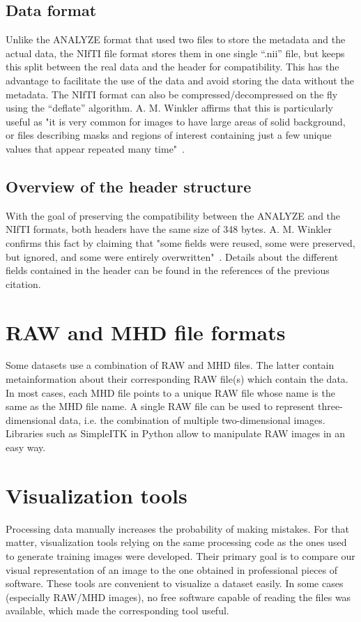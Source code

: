 \subsection{Data format}
\setlength{\marginparwidth}{3cm}\leavevmode {}Unlike the ANALYZE format that used two files to store the metadata and the actual data, the NIfTI file format stores them in one single “.nii” file, but keeps this split between the real data and the header for compatibility. This has the advantage to facilitate the use of the data and avoid storing the data without the metadata. The NIfTI format can also be compressed/decompressed on the fly using the “deflate” algorithm. A. M. Winkler affirms that this is particularly useful as "it is very common for images to have large areas of solid background, or files describing masks and regions of interest containing just a few unique values that appear repeated many time"~\cite{52}.


\subsection{Overview of the header structure}
\setlength{\marginparwidth}{3cm}\leavevmode {}With the goal of preserving the compatibility between the ANALYZE and the NIfTI formats, both headers have the same size of 348 bytes. A. M. Winkler confirms this fact by claiming that "some fields were reused, some were preserved, but ignored, and some were entirely overwritten"~\cite{52}. Details about the different fields contained in the header can be found in the references of the previous citation.


\section{RAW and MHD file formats}
\setlength{\marginparwidth}{3cm}\leavevmode {}Some datasets use a combination of RAW and MHD files. The latter contain metainformation about their corresponding RAW file(s) which contain the data. In most cases, each MHD file points to a unique RAW file whose name is the same as the MHD file name. A single RAW file can be used to represent three-dimensional data, i.e. the combination of multiple two-dimensional images. Libraries such as \mbox{SimpleITK} in Python allow to manipulate RAW images in an easy way. 



\section{Visualization tools}
\setlength{\marginparwidth}{3cm}\leavevmode {}Processing data manually increases the probability of making mistakes. For that matter, visualization tools relying on the same processing code as the ones used to generate training images were developed. Their primary goal is to compare our visual representation of an image to the one obtained in professional pieces of software. These tools are convenient to visualize a dataset easily. In some cases (especially RAW/MHD images), no free software capable of reading the files was available, which made the corresponding tool useful. 


